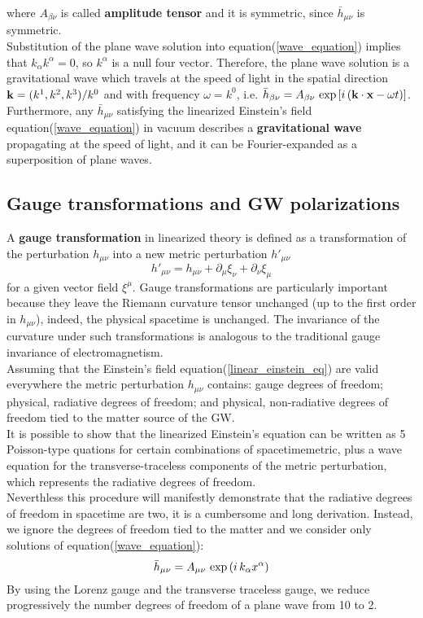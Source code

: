 where $A_{\beta \nu}$ is called \textbf{amplitude tensor} and it is symmetric, since $\bar{h}_{\mu \nu}$ is symmetric.\\
Substitution of the plane wave solution into equation(\ref{wave_equation}) implies that $k_{\alpha} k^{\alpha} =0$, so $k^{\alpha}$ is a null four vector. 
Therefore, the plane wave solution is a gravitational wave which travels at the speed of light in the spatial direction $\vb{k} = (k^{1},k^{2},k^{3})/k^{0}$ and with frequency $\omega=k^{0} $, i.e. $\bar{h}_{\beta \nu} = A_{\beta \nu} \, \exp\qty[i\, (\vb{k} \cdot \vb{x} - \omega t)]$.
Furthermore, any $\bar{h}_{\mu \nu}$ satisfying the linearized Einstein's field equation(\ref{wave_equation}) in vacuum describes a \textbf{gravitational wave} propagating at the speed of light, and it can be Fourier-expanded as a superposition of plane waves.
 

\subsection{Gauge transformations and GW polarizations}
A \textbf{gauge transformation} in linearized theory is defined as a transformation of the perturbation $h_{\mu \nu}$ into a new metric perturbation $h'_{\mu \nu}$
\begin{equation}
\label{gauge_transf}
h' _{\mu \nu} = h_{\mu \nu} + \partial_\mu \xi _{\nu} + \partial_\nu \xi _{\mu}
\end{equation}
for a given vector field $\xi^\mu$.
Gauge transformations are particularly important because they leave the Riemann curvature tensor unchanged (up to the first order in $h_{\mu \nu}$), indeed, the physical spacetime is unchanged. 
The invariance of the curvature under such transformations is analogous to the traditional gauge invariance of electromagnetism.\\
Assuming that the Einstein's field equation(\ref{linear_einstein_eq}) are valid everywhere the metric perturbation $h_{\mu \nu}$ contains: gauge degrees of freedom; physical, radiative degrees of freedom; and physical, non-radiative degrees of freedom tied to the matter source of the GW. \\
 It is possible to show that the linearized Einstein's equation can be written as 5 Poisson-type quations for certain combinations of spacetimemetric, plus a wave equation for the transverse-traceless components of the metric perturbation, which represents the radiative degrees of freedom.\\%
 Neverthless this procedure will manifestly demonstrate that the radiative degrees of freedom in spacetime are two, it is a cumbersome and long derivation.
Instead, we ignore the degrees of freedom tied to the matter and we consider only solutions of equation(\ref{wave_equation}):
\[
\bar{h}_{\mu \nu} = A_{\mu \nu} \, \exp\qty(i\, k_{\alpha} x^{\alpha})
\]
By using the Lorenz gauge and the transverse traceless gauge, we reduce progressively the number degrees of freedom of a plane wave from 10 to 2.\\


